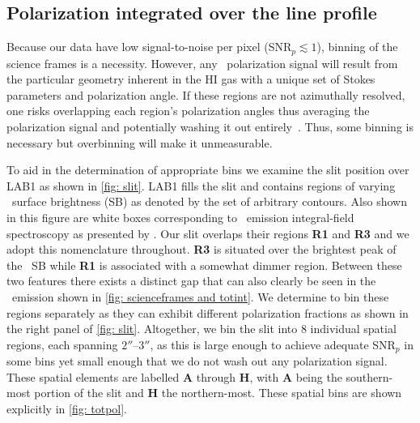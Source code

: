 \subsection{Polarization integrated over the line profile}\label{sec: spatial pol}

Because our data have low signal-to-noise per pixel (SNR$_p \lesssim 1$), binning of the science frames is a necessity. However, any \lya~polarization signal will result from the particular geometry inherent in the HI gas with a unique set of Stokes parameters and polarization angle. If these regions are not azimuthally resolved, one risks overlapping each region's polarization angles thus averaging the polarization signal and potentially washing it out entirely~\citep{DijkstraLoeb2008}. Thus, some binning is necessary but overbinning will make it unmeasurable. 


To aid in the determination of appropriate bins we examine the slit position over LAB1 as shown in \autoref{fig: slit}.  LAB1 fills the slit and contains regions of varying \lya~surface brightness (SB) as denoted by the set of arbitrary contours. Also shown in this figure are white boxes corresponding to \lya~emission integral-field spectroscopy as presented by \cite{Weijmans2010}. Our slit overlaps their regions \textbf{R1} and \textbf{R3} and we adopt this nomenclature throughout. \textbf{R3} is situated over the brightest peak of the \lya~SB while \textbf{R1} is associated with a somewhat dimmer region. Between these two features there exists a distinct gap that can also clearly be seen in the \lya~emission shown in \autoref{fig: scienceframes and totint}. We determine to bin these regions separately as they can exhibit different polarization fractions as shown in the right panel of \autoref{fig: slit}. Altogether, we bin the slit into 8 individual spatial regions, each spanning $2''$--$3''$, as this is large enough to achieve adequate SNR$_p$ in some bins yet small enough that we do not wash out any polarization signal. These spatial elements are labelled \textbf{A} through \textbf{H},  with \textbf{A} being the southern-most portion of the slit and \textbf{H} the northern-most. These spatial bins are shown explicitly in \autoref{fig: totpol}.

